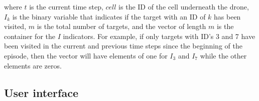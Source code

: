 \documentclass[../main.tex]{subfiles}
\begin{document}
\noindent 
where $t$ is the current time step, $cell$ is the ID of the
cell underneath the drone, $I_k$ is the binary variable 
that indicates if the target with an ID of $k$ has been
visited, $m$ is the total number of targets,
and the vector of length $m$ is the container for the
$I$ indicators. 
For example,
if only targets with ID's 3 and 7 have been visited
in the current and previous time steps since the beginning of the 
episode,
then the vector will have elements of one for $I_3$ and $I_7$ while
the other elements are zeros.

\subsection{User interface}

\lipsum[1]
\end{document}
